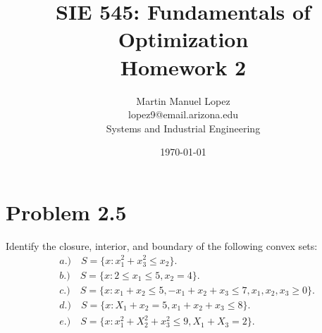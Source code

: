 \documentclass[12pt]{article}
\begin{document}
 
\title{SIE 545: Fundamentals of Optimization \\Homework 2}
\author{Martin Manuel Lopez \\lopez9@email.arizona.edu \\Systems and Industrial Engineering}
\date{\today}
\maketitle
 
\section{Problem 2.5}
Identify the closure, interior, and boundary of the following convex sets:
    \begin{align*}
        &a.) \quad S = \{ x: x_1^2 + x_3^2 \leq x_2\}.\\
        &b.) \quad S = \{ x: 2 \leq x_1 \leq 5, x_2 = 4 \}.\\
        &c.) \quad S = \{ x: x_1 + x_2 \leq 5, -x_1 + x_2 +x_3 \leq 7, x_1, x_2, x_3 \geq 0 \}.\\
        &d.) \quad S = \{ x: X_1 + x_2 = 5, x_1 + x_2 + x_3 \leq 8 \}.\\
        &e.) \quad S = \{ x: x_1^2 + X_2^2 + x_3^2 \leq 9 , X_1 + X_3 = 2\}.\\
    \end{align*} 
\end{document}
